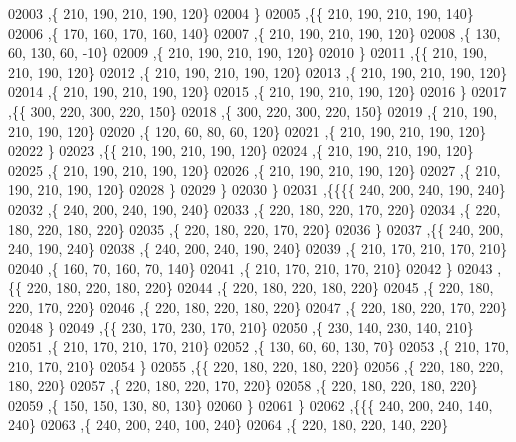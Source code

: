 \begin{DoxyCode}
02003     ,\{   210,   190,   210,   190,   120\}
02004     \}
02005    ,\{\{   210,   190,   210,   190,   140\}
02006     ,\{   170,   160,   170,   160,   140\}
02007     ,\{   210,   190,   210,   190,   120\}
02008     ,\{   130,    60,   130,    60,   -10\}
02009     ,\{   210,   190,   210,   190,   120\}
02010     \}
02011    ,\{\{   210,   190,   210,   190,   120\}
02012     ,\{   210,   190,   210,   190,   120\}
02013     ,\{   210,   190,   210,   190,   120\}
02014     ,\{   210,   190,   210,   190,   120\}
02015     ,\{   210,   190,   210,   190,   120\}
02016     \}
02017    ,\{\{   300,   220,   300,   220,   150\}
02018     ,\{   300,   220,   300,   220,   150\}
02019     ,\{   210,   190,   210,   190,   120\}
02020     ,\{   120,    60,    80,    60,   120\}
02021     ,\{   210,   190,   210,   190,   120\}
02022     \}
02023    ,\{\{   210,   190,   210,   190,   120\}
02024     ,\{   210,   190,   210,   190,   120\}
02025     ,\{   210,   190,   210,   190,   120\}
02026     ,\{   210,   190,   210,   190,   120\}
02027     ,\{   210,   190,   210,   190,   120\}
02028     \}
02029    \}
02030   \}
02031  ,\{\{\{\{   240,   200,   240,   190,   240\}
02032     ,\{   240,   200,   240,   190,   240\}
02033     ,\{   220,   180,   220,   170,   220\}
02034     ,\{   220,   180,   220,   180,   220\}
02035     ,\{   220,   180,   220,   170,   220\}
02036     \}
02037    ,\{\{   240,   200,   240,   190,   240\}
02038     ,\{   240,   200,   240,   190,   240\}
02039     ,\{   210,   170,   210,   170,   210\}
02040     ,\{   160,    70,   160,    70,   140\}
02041     ,\{   210,   170,   210,   170,   210\}
02042     \}
02043    ,\{\{   220,   180,   220,   180,   220\}
02044     ,\{   220,   180,   220,   180,   220\}
02045     ,\{   220,   180,   220,   170,   220\}
02046     ,\{   220,   180,   220,   180,   220\}
02047     ,\{   220,   180,   220,   170,   220\}
02048     \}
02049    ,\{\{   230,   170,   230,   170,   210\}
02050     ,\{   230,   140,   230,   140,   210\}
02051     ,\{   210,   170,   210,   170,   210\}
02052     ,\{   130,    60,    60,   130,    70\}
02053     ,\{   210,   170,   210,   170,   210\}
02054     \}
02055    ,\{\{   220,   180,   220,   180,   220\}
02056     ,\{   220,   180,   220,   180,   220\}
02057     ,\{   220,   180,   220,   170,   220\}
02058     ,\{   220,   180,   220,   180,   220\}
02059     ,\{   150,   150,   130,    80,   130\}
02060     \}
02061    \}
02062   ,\{\{\{   240,   200,   240,   140,   240\}
02063     ,\{   240,   200,   240,   100,   240\}
02064     ,\{   220,   180,   220,   140,   220\}

\end{DoxyCode}
